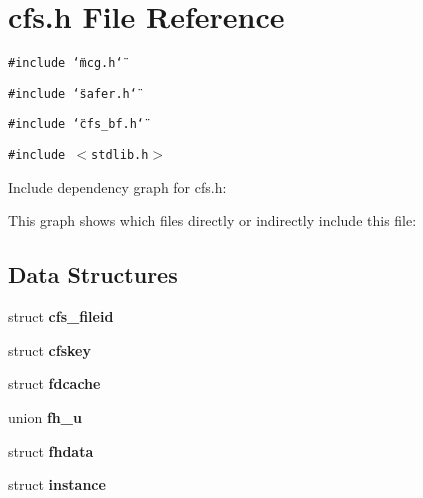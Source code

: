 \section{cfs.h File Reference}
\label{cfs_8h}


{\tt \#include \char`\"{}mcg.h\char`\"{}}\par
{\tt \#include \char`\"{}safer.h\char`\"{}}\par
{\tt \#include \char`\"{}cfs\_\-bf.h\char`\"{}}\par
{\tt \#include $<$stdlib.h$>$}\par


Include dependency graph for cfs.h:

This graph shows which files directly or indirectly include this file:\subsection*{Data Structures}
\begin{CompactItemize}
\item 
struct {\bf cfs\_\-fileid}
\item 
struct {\bf cfskey}
\item 
struct {\bf fdcache}
\item 
union {\bf fh\_\-u}
\item 
struct {\bf fhdata}
\item 
struct {\bf instance}
\end{CompactItemize}
